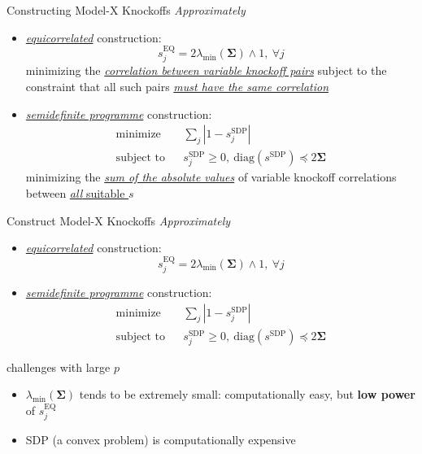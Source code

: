     \begin{frame}{Constructing Model-X Knockoffs \textit{Approximately}}
        \small
         \begin{itemize}
            \item<2-> \textcolor{glaucous!65!white}{\underline{\textit{equicorrelated}}} construction: 
            $$
            s^{\mathrm{EQ}}_j = 2\lambda_{\min}(\boldsymbol{\Sigma})\wedge 1,\ \forall j
            $$
            minimizing the \underline{\textit{correlation between variable knockoff pairs}} subject to the constraint that all such pairs \underline{\textit{must have the same correlation}}
            \item<3-> \textcolor{glaucous!65!white}{\underline{\textit{semidefinite programme}}} construction: 
            \begin{align*}
                \text{minimize} & & \sum_j\left\vert 1-s_j^{\mathrm{SDP}} \right\vert \\
                \text{subject to} & & s_j^{\mathrm{SDP}}\geq 0, \ \mathrm{diag}\left(s^{\mathrm{SDP}}\right)\preceq 2\boldsymbol{\Sigma}
            \end{align*}
            minimizing the \underline{\textit{sum of the absolute values}} of variable knockoff correlations between \underline{\textit{all} suitable $s$}
         \end{itemize}
    \end{frame}

    \begin{frame}{Construct Model-X Knockoffs \textit{Approximately}}
        
        {\footnotesize 
        \begin{itemize}
            \item \textcolor{glaucous!65!white}{\underline{\textit{equicorrelated}}} construction: 
            $$
            s^{\mathrm{EQ}}_j = 2\lambda_{\min}(\boldsymbol{\Sigma})\wedge 1,\ \forall j
            $$
            \item \textcolor{glaucous!65!white}{\underline{\textit{semidefinite programme}}} construction: 
            \begin{align*}
                \text{minimize} && \sum_j\left\vert 1-s_j^{\mathrm{SDP}} \right\vert \\
                \text{subject to} && s_j^{\mathrm{SDP}}\geq 0, \ \mathrm{diag}\left(s^{\mathrm{SDP}}\right)\preceq 2\boldsymbol{\Sigma}
            \end{align*}
        \end{itemize}
        }
        {\small 
        challenges with large $p$
        \begin{itemize}
            \item<2-> $\lambda_{\min}(\boldsymbol{\Sigma})$ tends to be extremely small: computationally easy, but \textbf{low power} of $s_j^{\mathrm{EQ}}$
            \item<3-> SDP (a convex problem) is computationally expensive 
        \end{itemize}
        }
    \end{frame}

